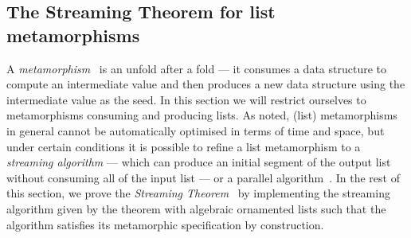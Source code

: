 \subsection{The Streaming Theorem for list metamorphisms}

A \emph{metamorphism}~\citep{Gibbons-metamorphisms} is an unfold after a fold --- it consumes a data structure to compute an intermediate value and then produces a new data structure using the intermediate value as the seed.
In this section we will restrict ourselves to metamorphisms consuming and producing lists.
As \citeauthor{Gibbons-metamorphisms} noted, (list) metamorphisms in general cannot be automatically optimised in terms of time and space, but under certain conditions it is possible to refine a list metamorphism to a \emph{streaming algorithm} --- which can produce an initial segment of the output list without consuming all of the input list --- or a parallel algorithm~\citep{Nakano-jigsaw}.
In the rest of this section, we prove the \emph{Streaming Theorem}~\citep[Theorem~30]{Bird-arithmetic-coding} by implementing the streaming algorithm given by the theorem with algebraic ornamented lists such that the algorithm satisfies its metamorphic specification by construction.

